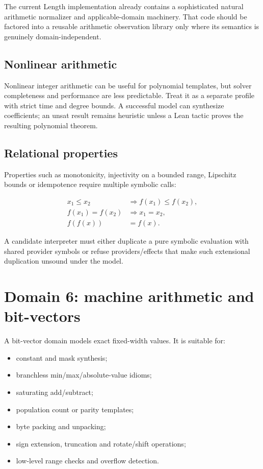 \documentclass[11pt,oneside]{report}
\begin{document}
The current Length implementation already contains a sophisticated natural arithmetic normalizer and applicable-domain machinery. That code should be factored into a reusable arithmetic observation library only where its semantics is genuinely domain-independent.

\subsection{Nonlinear arithmetic}

Nonlinear integer arithmetic can be useful for polynomial templates, but solver completeness and performance are less predictable. Treat it as a separate profile with strict time and degree bounds. A successful model can synthesize coefficients; an unsat result remains heuristic unless a Lean tactic proves the resulting polynomial theorem.

\subsection{Relational properties}

Properties such as monotonicity, injectivity on a bounded range, Lipschitz bounds or idempotence require multiple symbolic calls:

\begin{align*}
 x_1\le x_2 &\Longrightarrow f(x_1)\le f(x_2),\\
 f(x_1)=f(x_2) &\Longrightarrow x_1=x_2,\\
 f(f(x)) &= f(x).
\end{align*}

A candidate interpreter must either duplicate a pure symbolic evaluation with shared provider symbols or refuse providers/effects that make such extensional duplication unsound under the model.

\section{Domain 6: machine arithmetic and bit-vectors}
\label{sec:domain-bitvector}

A bit-vector domain models exact fixed-width values. It is suitable for:

\begin{itemize}[leftmargin=2em]
\item constant and mask synthesis;
\item branchless min/max/absolute-value idioms;
\item saturating add/subtract;
\item population count or parity templates;
\item byte packing and unpacking;
\item sign extension, truncation and rotate/shift operations;
\item low-level range checks and overflow detection.
\end{itemize}
\end{document}
